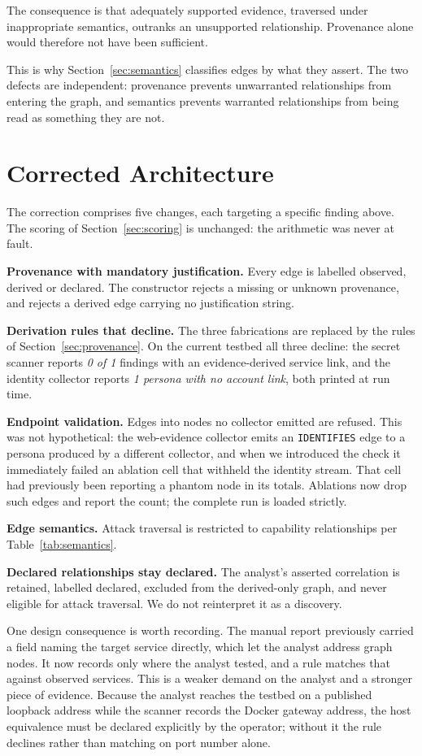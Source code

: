 \documentclass[11pt,a4paper]{article}
\begin{document}
The consequence is that adequately supported evidence, traversed under inappropriate semantics, outranks an unsupported relationship. Provenance alone would therefore not have been sufficient.

This is why Section~\ref{sec:semantics} classifies edges by what they assert. The two defects are independent: provenance prevents unwarranted relationships from entering the graph, and semantics prevents warranted relationships from being read as something they are not.

\section{Corrected Architecture}\label{sec:corrected}
The correction comprises five changes, each targeting a specific finding above. The scoring of Section~\ref{sec:scoring} is unchanged: the arithmetic was never at fault.

\textbf{Provenance with mandatory justification.} Every edge is labelled observed, derived or declared. The constructor rejects a missing or unknown provenance, and rejects a derived edge carrying no justification string.

\textbf{Derivation rules that decline.} The three fabrications are replaced by the rules of Section~\ref{sec:provenance}. On the current testbed all three decline: the secret scanner reports \emph{0 of 1} findings with an evidence-derived service link, and the identity collector reports \emph{1 persona with no account link}, both printed at run time.

\textbf{Endpoint validation.} Edges into nodes no collector emitted are refused. This was not hypothetical: the web-evidence collector emits an \texttt{IDENTIFIES} edge to a persona produced by a different collector, and when we introduced the check it immediately failed an ablation cell that withheld the identity stream. That cell had previously been reporting a phantom node in its totals. Ablations now drop such edges and report the count; the complete run is loaded strictly.

\textbf{Edge semantics.} Attack traversal is restricted to capability relationships per Table~\ref{tab:semantics}.

\textbf{Declared relationships stay declared.} The analyst's asserted correlation is retained, labelled declared, excluded from the derived-only graph, and never eligible for attack traversal. We do not reinterpret it as a discovery.

One design consequence is worth recording. The manual report previously carried a field naming the target service directly, which let the analyst address graph nodes. It now records only where the analyst tested, and a rule matches that against observed services. This is a weaker demand on the analyst and a stronger piece of evidence. Because the analyst reaches the testbed on a published loopback address while the scanner records the Docker gateway address, the host equivalence must be declared explicitly by the operator; without it the rule declines rather than matching on port number alone.
\end{document}
